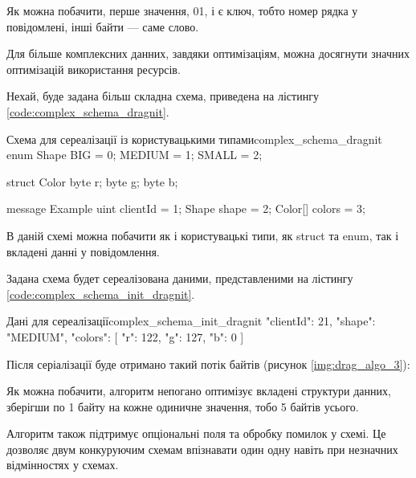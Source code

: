 \documentclass{lib/styles/default-style}
\begin{document}

    Як можна побачити, перше значення, 01, і є ключ, тобто номер рядка у повідомлені, інші байти --- саме слово.
    
    Для більше комплексних данних, завдяки оптимізаціям, можна досягнути значних оптимізацій використання ресурсів.

    Нехай, буде задана більш складна схема, приведена на лістингу \ref{code:complex_schema_dragnit}.

    \begin{stdout}{Схема для сереалізації із користувацькими типами}{complex_schema_dragnit}
        enum Shape {
            BIG = 0;
            MEDIUM = 1;
            SMALL = 2;
        }

        struct Color {
            byte r;
            byte g;
            byte b;
        }

        message Example {
            uint clientId = 1;
            Shape shape = 2;
            Color[] colors = 3;
        }\end{stdout}
    
    В даній схемі можна побачити як і користувацькі типи, як struct та enum, так і вкладені данні у повідомлення.
    
    Задана схема будет сереалізована даними, представленими на лістингу \ref{code:complex_schema_init_dragnit}.

    \begin{stdout}{Дані для сереалізації}{complex_schema_init_dragnit}
        {
            "clientId": 21,
            "shape": "MEDIUM",
            "colors": [
                {
                    "r": 122,
                    "g": 127,
                    "b": 0
                }
            ]
        }\end{stdout}
    
    Після серіалізації буде отримано такий потік байтів (рисунок \ref{img:drag_algo_3}):


    Як можна побачити, алгоритм непогано оптимізує вкладені структури данних,
    зберігши по 1 байту на кожне одиничне значення, тобо 5 байтів усього.

    Алгоритм також підтримує опціональні поля та обробку помилок у схемі. Це дозволяє двум конкуруючим схемам
    впізнавати один одну навіть при незначних відмінностях у схемах.
\end{document}
